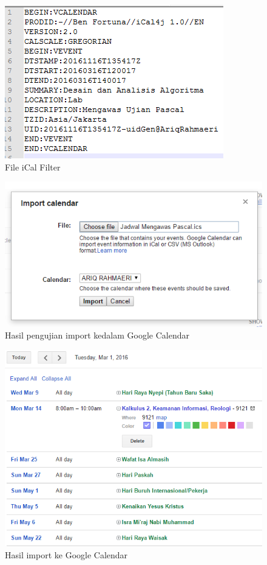 		\begin{figure}[H]
		\centering
		\includegraphics[scale=0.7]{Gambar/fileiCalFilter}
		\caption{File iCal Filter}
		\label{fig:fileiCalFilter}
		\end{figure}
	
 
		\begin{figure}[H]
		\centering
		\includegraphics[scale=0.8]{Gambar/importGC}
		\caption{Hasil pengujian import kedalam Google Calendar}
		\label{fig:importGC}
		\end{figure}
		
		\begin{figure}[H]
		\centering
		\includegraphics[scale=0.7]{Gambar/hasilGC}
		\caption{Hasil import ke Google Calendar}
		\label{fig:hasilGC}
		\end{figure}
		
